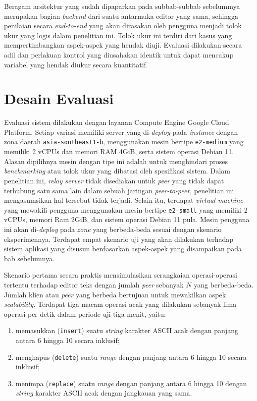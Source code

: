 Beragam arsitektur yang sudah dipaparkan pada subbab-subbab sebelummya merupakan bagian \textit{backend} dari suatu antarmuka editor yang sama, sehingga penilaian secara \textit{end-to-end} yang akan dirasakan oleh pengguna menjadi tolok ukur yang logis dalam penelitian ini. Tolok ukur ini terdiri dari kasus yang mempertimbangkan aspek-aspek yang hendak diuji. Evaluasi dilakukan secara adil dan perlakuan kontrol yang diusahakan identik untuk dapat mencakup variabel yang hendak diukur secara kuantitatif.

\section{Desain Evaluasi}
\label{sec:desain_evaluasi}

Evaluasi sistem dilakukan dengan layanan Compute Engine Google Cloud Platform. Setiap variasi memiliki server yang di-\textit{deploy} pada \textit{instance} dengan zona daerah \texttt{asia-southeast1-b}, menggunakan mesin bertipe \texttt{e2-medium} yang memiliki 2 vCPUs dan memori RAM 4GiB, serta sistem operasi Debian 11. Alasan dipilihnya mesin dengan tipe ini adalah untuk menghindari proses \textit{benchmarking} atau tolok ukur yang dibatasi oleh spesifikasi sistem. Dalam penelitian ini, \textit{relay server} tidak disediakan untuk \textit{peer} yang tidak dapat terhubung satu sama lain dalam sebuah jaringan \textit{peer-to-peer}, penelitian ini mengasumsikan hal tersebut tidak terjadi. Selain itu, terdapat \textit{virtual machine} yang mewakili pengguna menggunakan mesin bertipe \texttt{e2-small} yang memiliki 2 vCPUs, memori Ram 2GiB, dan sistem operasi Debian 11 pula. Mesin pengguna ini akan di-\textit{deploy} pada \textit{zone} yang berbeda-beda sesuai dengan skenario eksperimennya. Terdapat empat skenario uji yang akan dilakukan terhadap sistem aplikasi yang disusun berdasarkan aspek-aspek yang disampaikan pada bab sebelumnya.

Skenario pertama secara praktis mensimulasikan serangkaian operasi-operasi tertentu terhadap editor teks dengan jumlah \textit{peer} sebanyak $N$ yang berbeda-beda. Jumlah klien atau \textit{peer} yang berbeda bertujuan untuk mewakilkan aspek \textit{scalability}. Terdapat tiga macam operasi acak yang dilakukan sebanyak lima operasi per detik dalam periode uji tiga menit, yaitu:

\begin{enumerate}[nolistsep]
    \item memasukkan (\texttt{insert}) suatu \textit{string} karakter ASCII acak dengan panjang antara 6 hingga 10 secara inklusif;
    \item menghapus (\texttt{delete}) suatu \textit{range} dengan panjang antara 6 hingga 10 secara inklusif;
    \item menimpa (\texttt{replace}) suatu \textit{range} dengan panjang antara 6 hingga 10 dengan \textit{string} karakter ASCII acak dengan jangkauan yang sama.
\end{enumerate}

